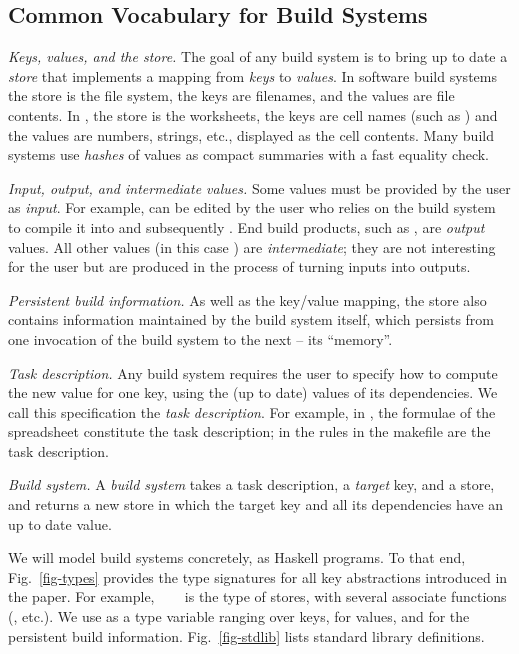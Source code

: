\subsection{Common Vocabulary for Build Systems}\label{sec-vocabulary}

\emph{Keys, values, and the store.} The goal of any build system is to
bring up to date a \emph{store} that implements a mapping from \emph{keys} to
\emph{values}. In software build systems the store is the file system, the
keys are filenames, and the values are file contents. In \Excel, the store is
the worksheets, the keys are cell names (such as ) and the values are
numbers, strings, etc., displayed as the cell contents. Many build systems use
\emph{hashes} of values as compact summaries with a fast equality check.

\emph{Input, output, and intermediate values.} Some values must be provided by
the user as \emph{input}. For example,  can be edited by the user
who relies on the build system to compile it into  and subsequently
. End build products, such as , are \emph{output}
values. All other values (in this case ) are \emph{intermediate};
they are not interesting for the user but are produced in the process of turning
inputs into outputs.

\emph{Persistent build information.} As well as the key/value mapping, the
store also contains information maintained by the build system itself, which
persists from one invocation of the build system to the next -- its ``memory''.

\emph{Task description.} Any build system requires the user to specify how
to compute the new value for one key, using the (up to date) values of its
dependencies. We call this specification the \emph{task description}. For
example, in \Excel, the formulae of the spreadsheet constitute the task
description; in \Make the rules in the makefile are the task description.

\emph{Build system.} A \emph{build system} takes a task description, a
\emph{target} key, and a store, and returns a new store in which the target key
and all its dependencies have an up to date value.

We will model build systems concretely, as Haskell programs. To that end,
Fig.~\ref{fig-types} provides the type signatures for all key abstractions
introduced in the paper. For example, ~~~ is the
type of stores, with several associate functions (, etc.). We use
 as a type variable ranging over keys,  for values, and  for
the persistent build information. Fig.~\ref{fig-stdlib} lists standard library
definitions.

